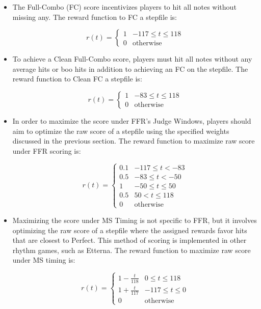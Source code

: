 \begin{itemize}
    \item The Full-Combo (FC) score incentivizes players to hit all notes without missing any. The reward function to FC a stepfile is:

    $$r(t) = \begin{cases} 
          1 & -117 \leq t \leq 118 \\
          0 & \text{otherwise}
       \end{cases}$$

    \item To achieve a Clean Full-Combo score, players must hit all notes without any average hits or boo hits in addition to achieving an FC on the stepfile. The reward function to Clean FC a stepfile is:

    $$r(t) = \begin{cases} 
          1 & -83 \leq t \leq 118 \\
          0 & \text{otherwise}
       \end{cases}$$

    \item In order to maximize the score under FFR's Judge Windows, players should aim to optimize the raw score of a stepfile using the specified weights discussed in the previous section. The reward function to maximize raw score under FFR scoring is:

    $$r(t) = \begin{cases} 
          0.1 & -117 \leq t < -83 \\
          0.5 & -83 \leq t < -50 \\
          1 & -50 \leq t \leq 50 \\
          0.5 & 50 < t \leq 118 \\
          0 & \text{otherwise}
       \end{cases}$$

    \item Maximizing the score under MS Timing is not specific to FFR, but it involves optimizing the raw score of a stepfile where the assigned rewards favor hits that are closest to Perfect. This method of scoring is implemented in other rhythm games, such as Etterna. The reward function to maximize raw score under MS timing is:

    $$r(t) = \begin{cases} 
          1- \frac{t}{118} & 0 \leq t \leq 118 \\
          1 + \frac{t}{117} & -117 \leq t \leq 0 \\
          0 & \text{otherwise}
       \end{cases}$$


\end{itemize}
